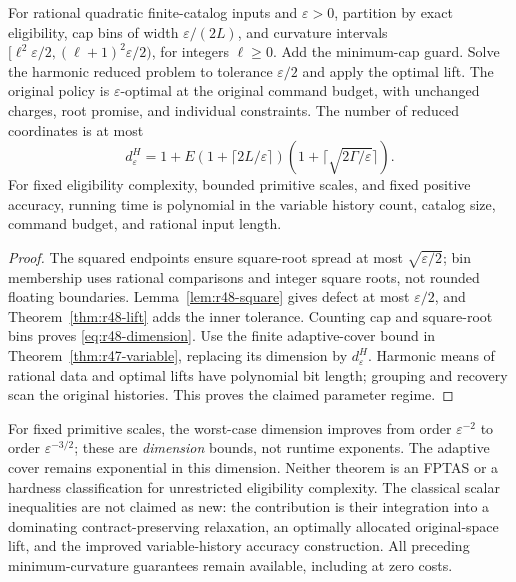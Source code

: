 \begin{theorem}\label{thm:r48-scheme}
For rational quadratic finite-catalog inputs and $\varepsilon>0$, partition by exact eligibility, cap bins of width $\varepsilon/(2L)$, and curvature intervals
$[\ell^2\varepsilon/2,(\ell+1)^2\varepsilon/2)$, for integers $\ell\geq0$. Add the minimum-cap guard. Solve the harmonic reduced problem to tolerance $\varepsilon/2$ and apply the optimal lift. The original policy is $\varepsilon$-optimal at the original command budget, with unchanged charges, root promise, and individual constraints. The number of reduced coordinates is at most
\begin{equation}\label{eq:r48-dimension}
 d^H_\varepsilon=
 1+E(1+\lceil2L/\varepsilon\rceil)
       (1+\lceil\sqrt{2\Gamma/\varepsilon}\rceil).
\end{equation}
For fixed eligibility complexity, bounded primitive scales, and fixed positive accuracy, running time is polynomial in the variable history count, catalog size, command budget, and rational input length.
\end{theorem}
\begin{proof}
The squared endpoints ensure square-root spread at most $\sqrt{\varepsilon/2}$; bin membership uses rational comparisons and integer square roots, not rounded floating boundaries. Lemma~\ref{lem:r48-square} gives defect at most $\varepsilon/2$, and Theorem~\ref{thm:r48-lift} adds the inner tolerance. Counting cap and square-root bins proves \eqref{eq:r48-dimension}. Use the finite adaptive-cover bound in Theorem~\ref{thm:r47-variable}, replacing its dimension by $d^H_\varepsilon$. Harmonic means of rational data and optimal lifts have polynomial bit length; grouping and recovery scan the original histories. This proves the claimed parameter regime.
\end{proof}

For fixed primitive scales, the worst-case dimension improves from order $\varepsilon^{-2}$ to order $\varepsilon^{-3/2}$; these are \emph{dimension} bounds, not runtime exponents. The adaptive cover remains exponential in this dimension. Neither theorem is an FPTAS or a hardness classification for unrestricted eligibility complexity. The classical scalar inequalities are not claimed as new: the contribution is their integration into a dominating contract-preserving relaxation, an optimally allocated original-space lift, and the improved variable-history accuracy construction. All preceding minimum-curvature guarantees remain available, including at zero costs.
